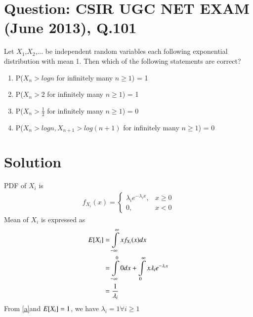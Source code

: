 \documentclass[journal,12pt,twocolumn]{IEEEtran}
\begin{document}
\section*{Question: CSIR UGC NET EXAM (June 2013), Q.101}
Let $X_1$,$X_2$,... be independent random variables each following exponential distribution with mean 1. Then which of the following statements are correct?
\begin{enumerate}
    \item P($X_n > log n$ for infinitely many $n \geq 1$) = 1
    \item P($X_n > 2$ for infinitely many $n \geq 1$) = 1
    \item P($X_n > \frac{1}{2}$ for infinitely many $n \geq 1$) = 0
    \item P($X_n > log n, X_{n+1}>log(n+1)$ for infinitely many $n \geq 1$) = 0
\end{enumerate}
\section*{Solution}
\newcommand{\Integral}[2]{\ensuremath{\int\limits_{#1}^{#2}}}

PDF of $X_i$ is
\begin{align}
    f_{X_i}(x)=\begin{cases}\lambda_i e^{-\lambda_i x}, &x\geq 0\\
                0, &x<0\nonumber
    \end{cases}    
\end{align} 
Mean of $X_i$ is expressed as
\begin{align}
    \mean{X_i}&=\Integral{-\infty}{\infty}x f_{X_i}(x) dx\nonumber\\
              &=\Integral{-\infty}{0}0 dx + \Integral{0}{\infty}x \lambda_i e^{-\lambda_i x}\nonumber\\
              &=\frac{1}{\lambda_i}\label{a}
\end{align}
From \eqref{a}and $E[ X_i ]=1$, we have $\lambda_i=1 \forall  i \geq1$
\end{document}
